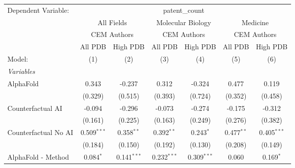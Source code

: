 \begingroup
\centering
\begin{tabular}{lcccccc}
   \tabularnewline \midrule \midrule
   Dependent Variable: & \multicolumn{6}{c}{patent\_count}\\
 & \multicolumn{2}{c}{All Fields} & \multicolumn{2}{c}{Molecular Biology} & \multicolumn{2}{c}{Medicine} \\
\cmidrule(lr){2-3} \cmidrule(lr){4-5} \cmidrule(lr){6-7}
 & \multicolumn{2}{c}{CEM Authors} & \multicolumn{2}{c}{CEM Authors} & \multicolumn{2}{c}{CEM Authors} \\
\cmidrule(lr){2-3} \cmidrule(lr){4-5} \cmidrule(lr){6-7}
 & \multicolumn{1}{c}{All PDB} & \multicolumn{1}{c}{High PDB} & \multicolumn{1}{c}{All PDB} & \multicolumn{1}{c}{High PDB} & \multicolumn{1}{c}{All PDB} & \multicolumn{1}{c}{High PDB} \\
\cmidrule(lr){2-2} \cmidrule(lr){3-3} \cmidrule(lr){4-4} \cmidrule(lr){5-5} \cmidrule(lr){6-6} \cmidrule(lr){7-7}
   Model:                                                     & (1)           & (2)           & (3)           & (4)           & (5)           & (6)\\  
   \midrule
   \emph{Variables}\\
   AlphaFold                                                  & 0.343         & -0.237        & 0.312         & -0.324        & 0.477         & 0.119\\   
                                                              & (0.329)       & (0.515)       & (0.393)       & (0.724)       & (0.352)       & (0.458)\\   
   Counterfactual AI                                          & -0.094        & -0.296        & -0.073        & -0.274        & -0.175        & -0.312\\   
                                                              & (0.161)       & (0.225)       & (0.163)       & (0.249)       & (0.276)       & (0.382)\\   
   Counterfactual No AI                                       & 0.509$^{***}$ & 0.358$^{**}$  & 0.392$^{**}$  & 0.243$^{*}$   & 0.477$^{**}$  & 0.405$^{***}$\\   
                                                              & (0.184)       & (0.150)       & (0.192)       & (0.130)       & (0.208)       & (0.149)\\   
   AlphaFold - Method                                         & 0.084$^{*}$   & 0.141$^{***}$ & 0.232$^{***}$ & 0.309$^{***}$ & 0.060         & 0.169$^{*}$\\   

\end{tabular}

